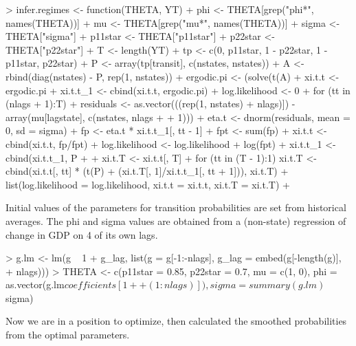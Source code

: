 \begin{Schunk}
\begin{Sinput}
> infer.regimes <- function(THETA, YT) {
+     phi <- THETA[grep("phi*", names(THETA))]
+     mu <- THETA[grep("mu*", names(THETA))]
+     sigma <- THETA["sigma"]
+     p11star <- THETA["p11star"]
+     p22star <- THETA["p22star"]
+     T <- length(YT)
+     tp <- c(0, p11star, 1 - p22star, 1 - p11star, p22star)
+     P <- array(tp[transit], c(nstates, nstates))
+     A <- rbind(diag(nstates) - P, rep(1, nstates))
+     ergodic.pi <- (solve(t(A) %
+     xi.t.t <- ergodic.pi %
+     xi.t.t_1 <- cbind(xi.t.t, ergodic.pi)
+     log.likelihood <- 0
+     for (tt in (nlags + 1):T) {
+         residuals <- as.vector(((rep(1, nstates) %
+             nlags)]) - array(mu[lagstate], c(nstates, nlags + 
+             1))) %
+         eta.t <- dnorm(residuals, mean = 0, sd = sigma)
+         fp <- eta.t * xi.t.t_1[, tt - 1]
+         fpt <- sum(fp)
+         xi.t.t <- cbind(xi.t.t, fp/fpt)
+         log.likelihood <- log.likelihood + log(fpt)
+         xi.t.t_1 <- cbind(xi.t.t_1, P %
+     }
+     xi.t.T <- xi.t.t[, T] %
+     for (tt in (T - 1):1) xi.t.T <- cbind(xi.t.t[, tt] * (t(P) %
+         (xi.t.T[, 1]/xi.t.t_1[, tt + 1])), xi.t.T)
+     list(log.likelihood = log.likelihood, xi.t.t = xi.t.t, xi.t.T = xi.t.T)
+ }
\end{Sinput}
\end{Schunk}
Initial values of the parameters for transition probabilities are set from historical averages.
The phi and sigma values are obtained from a (non-state) regression of change in GDP on 4 of its own lags.
\begin{Schunk}
\begin{Sinput}
> g.lm <- lm(g ~ 1 + g_lag, list(g = g[-1:-nlags], g_lag = embed(g[-length(g)], 
+     nlags)))
> THETA <- c(p11star = 0.85, p22star = 0.7, mu = c(1, 0), phi = as.vector(g.lm$coefficients[1 + 
+     (1:nlags)]), sigma = summary(g.lm)$sigma)
\end{Sinput}
\end{Schunk}
Now we are in a position to optimize, then calculated the smoothed probabilities from the
optimal parameters. 
